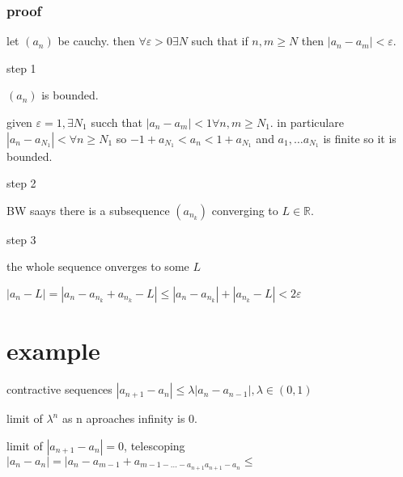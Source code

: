 \documentclass[letterpaper]{article}
\begin{document}
\subsubsection*{proof}
let $(a_n)$ be cauchy. then $\forall\varepsilon>0\exists N$ such that if $n,m\ge N$ then $\left\lvert a_n-a_m\right\rvert<\varepsilon$.

step 1

$(a_n)$ is bounded.

given $\varepsilon=1, \exists N_1$ succh that $\left\lvert a_n-a_m\right\rvert<1\forall n,m\ge  N_1$. in particulare $\left\lvert a_n-a_{N_1}\right\rvert<\forall n\ge N_1$ so $-1+a_{N_1}<a_n<1+a_{N_1}$ and $a_1,\dots a_{N_1}$ is finite so it is bounded.

step 2

BW saays there is a subsequence $(a_{n_k})$ converging to $L\in\mathbb{R}$.

step 3

the whole sequence onverges to some $L$

$\left\lvert a_n-L\right\rvert=\left\lvert a_n-a_{n_k}+a_{n_k}-L\right\rvert\le\left\lvert a_n-a_{n_k}\right\rvert+\left\lvert a_{n_k}-L\right\rvert<2\varepsilon$

\section*{example}
contractive sequences $\left\lvert a_{n+1}-a_n\right\rvert\le\lambda\left\lvert a_n-a_{n-1}\right\rvert,\lambda\in(0,1)$

limit of $\lambda^n$ as n aproaches infinity is 0.

limit of $\left\lvert a_{n+1}-a_n\right\rvert=0$, telescoping $|a_n-a_n|=|a_n-a_{m-1}+a_{m-1-\dots-a_{n+1}a_{n+1}-a_n}\le$
\end{document}
